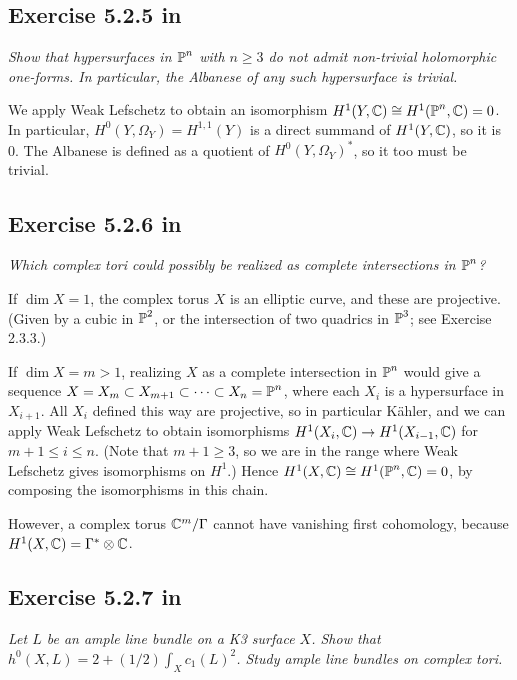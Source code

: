 \documentclass{article}
\begin{document}
\subsection*{Exercise 5.2.5 in \cite{Huy}}
\emph{Show that hypersurfaces in $\operatorname{\mathbb{P}}^n$ with $n \geq 3$ do not admit non-trivial holomorphic
one-forms. In particular, the Albanese of any such hypersurface is trivial.}
\vspace{3mm}

We apply Weak Lefschetz to obtain an isomorphism $H^1(Y,\mathbb{C}) \cong H^1(\operatorname{\mathbb{P}}^n,\mathbb{C}) = 0$. In particular,
$H^0(Y,\Omega_Y) = H^{1,1}(Y)$ is a direct summand of $H^1(Y,\mathbb{C})$, so it is 0. The Albanese is defined as a
quotient of $H^0(Y,\Omega_Y)^*$, so it too must be trivial.




\subsection*{Exercise 5.2.6 in \cite{Huy}}
\emph{Which complex tori could possibly be realized as complete intersections in $\operatorname{\mathbb{P}}^n$?}
\vspace{3mm}

If $\dim X = 1$, the complex torus $X$ is an elliptic curve, and these are projective. (Given by a cubic in
$\operatorname{\mathbb{P}}^2$, or the intersection of two quadrics in $\operatorname{\mathbb{P}}^3$; see Exercise 2.3.3.)

If $\dim X = m >1$, realizing $X$ as a complete intersection in $\operatorname{\mathbb{P}}^n$ would give a sequence
$X = X_m \subset X_{m+1} \subset \dots \subset X_n = \operatorname{\mathbb{P}}^n$, where each $X_i$ is a hypersurface in $X_{i+1}$. All
$X_i$ defined this way are projective, so in particular K\"{a}hler, and we can apply Weak Lefschetz to obtain
isomorphisms $H^1(X_{i},\mathbb{C}) \to H^1(X_{i-1},\mathbb{C})$ for $m+1\leq i \leq n$. (Note that $m+1\geq 3$, so we are in the range
where Weak Lefschetz gives isomorphisms on $H^1$.) Hence $H^1(X,\mathbb{C}) \cong H^1(\operatorname{\mathbb{P}}^n,\mathbb{C}) = 0$, by composing the isomorphisms
in this chain.

However, a complex torus $\mathbb{C}^m/\Gamma$ cannot have vanishing first cohomology, because $H^1(X,\mathbb{C}) = \Gamma^* \otimes \mathbb{C}$.



\subsection*{Exercise 5.2.7 in \cite{Huy}}
\emph{Let $L$ be an ample line bundle on a K3 surface $X$. Show that $h^0(X, L) = 2 + (1/2) \int_X c_1(L)^2$. 
Study ample line bundles on complex tori.}
\vspace{3mm}
\end{document}
